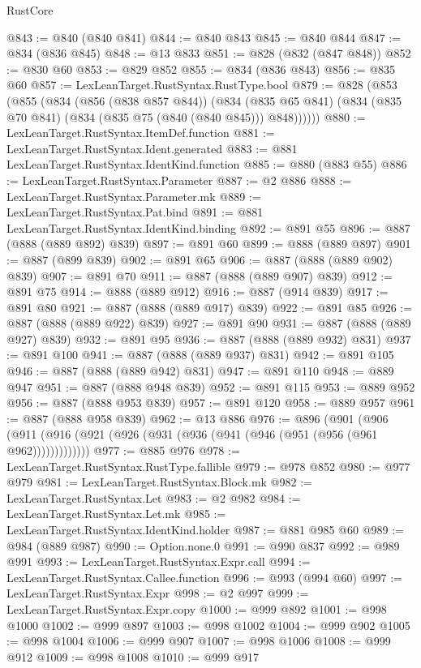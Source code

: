 \begin{lexlean}{RustCore}
\begin{coremodule}
@843 := @840 (@840 @841)
@844 := @840 @843
@845 := @840 @844
@847 := @834 (@836 @845)
@848 := @13 @833
@851 := @828 (@832 (@847 @848))
@852 := @830 @60
@853 := @829 @852
@855 := @834 (@836 @843)
@856 := @835 @60
@857 := LexLeanTarget.RustSyntax.RustType.bool
@879 := @828
    (@853
      (@855
        (@834
          (@856 (@838 @857 @844))
          (@834 (@835 @65 @841) (@834 (@835 @70 @841) (@834 (@835 @75 (@840 (@840 @845))) @848))))))
@880 := LexLeanTarget.RustSyntax.ItemDef.function
@881 := LexLeanTarget.RustSyntax.Ident.generated
@883 := @881 LexLeanTarget.RustSyntax.IdentKind.function
@885 := @880 (@883 @55)
@886 := LexLeanTarget.RustSyntax.Parameter
@887 := @2 @886
@888 := LexLeanTarget.RustSyntax.Parameter.mk
@889 := LexLeanTarget.RustSyntax.Pat.bind
@891 := @881 LexLeanTarget.RustSyntax.IdentKind.binding
@892 := @891 @55
@896 := @887 (@888 (@889 @892) @839)
@897 := @891 @60
@899 := @888 (@889 @897)
@901 := @887 (@899 @839)
@902 := @891 @65
@906 := @887 (@888 (@889 @902) @839)
@907 := @891 @70
@911 := @887 (@888 (@889 @907) @839)
@912 := @891 @75
@914 := @888 (@889 @912)
@916 := @887 (@914 @839)
@917 := @891 @80
@921 := @887 (@888 (@889 @917) @839)
@922 := @891 @85
@926 := @887 (@888 (@889 @922) @839)
@927 := @891 @90
@931 := @887 (@888 (@889 @927) @839)
@932 := @891 @95
@936 := @887 (@888 (@889 @932) @831)
@937 := @891 @100
@941 := @887 (@888 (@889 @937) @831)
@942 := @891 @105
@946 := @887 (@888 (@889 @942) @831)
@947 := @891 @110
@948 := @889 @947
@951 := @887 (@888 @948 @839)
@952 := @891 @115
@953 := @889 @952
@956 := @887 (@888 @953 @839)
@957 := @891 @120
@958 := @889 @957
@961 := @887 (@888 @958 @839)
@962 := @13 @886
@976 := @896
    (@901 (@906 (@911 (@916 (@921 (@926 (@931 (@936 (@941 (@946 (@951 (@956 (@961 @962)))))))))))))
@977 := @885 @976
@978 := LexLeanTarget.RustSyntax.RustType.fallible
@979 := @978 @852
@980 := @977 @979
@981 := LexLeanTarget.RustSyntax.Block.mk
@982 := LexLeanTarget.RustSyntax.Let
@983 := @2 @982
@984 := LexLeanTarget.RustSyntax.Let.mk
@985 := LexLeanTarget.RustSyntax.IdentKind.holder
@987 := @881 @985 @60
@989 := @984 (@889 @987)
@990 := Option.none.{0}
@991 := @990 @837
@992 := @989 @991
@993 := LexLeanTarget.RustSyntax.Expr.call
@994 := LexLeanTarget.RustSyntax.Callee.function
@996 := @993 (@994 @60)
@997 := LexLeanTarget.RustSyntax.Expr
@998 := @2 @997
@999 := LexLeanTarget.RustSyntax.Expr.copy
@1000 := @999 @892
@1001 := @998 @1000
@1002 := @999 @897
@1003 := @998 @1002
@1004 := @999 @902
@1005 := @998 @1004
@1006 := @999 @907
@1007 := @998 @1006
@1008 := @999 @912
@1009 := @998 @1008
@1010 := @999 @917

\end{coremodule}
\end{lexlean}
